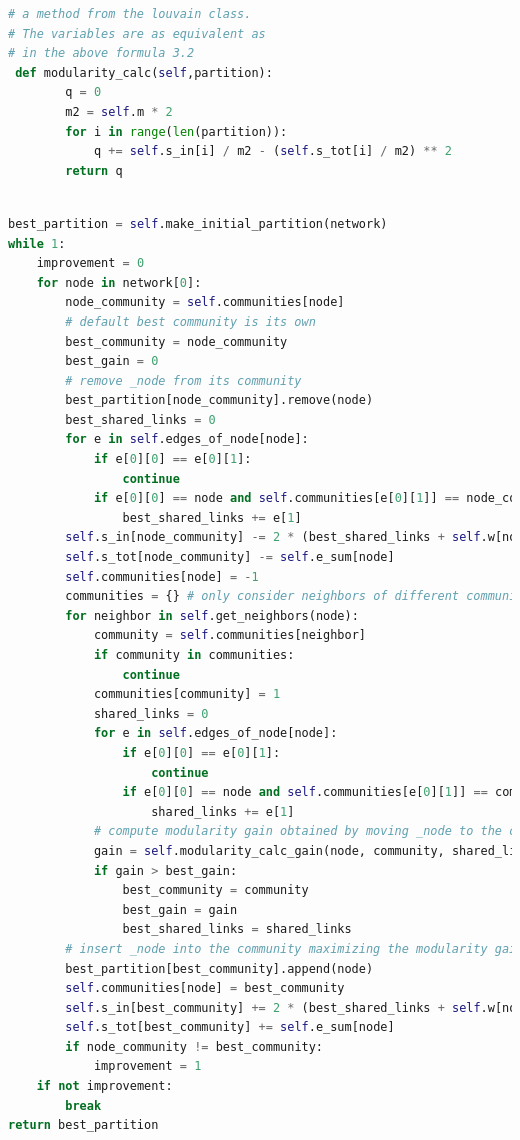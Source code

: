 \begin{lstlisting}[language=Python, caption=Modularity Calculation]
# a method from the louvain class. 
# The variables are as equivalent as 
# in the above formula 3.2
 def modularity_calc(self,partition):
        q = 0
        m2 = self.m * 2 
        for i in range(len(partition)):
            q += self.s_in[i] / m2 - (self.s_tot[i] / m2) ** 2
        return q
    
\end{lstlisting}

\begin{lstlisting}[language=Python, caption=First Phase of Louvain Algorithm]
best_partition = self.make_initial_partition(network)
while 1:
    improvement = 0
    for node in network[0]:
        node_community = self.communities[node]
        # default best community is its own
        best_community = node_community
        best_gain = 0
        # remove _node from its community
        best_partition[node_community].remove(node)
        best_shared_links = 0
        for e in self.edges_of_node[node]:
            if e[0][0] == e[0][1]:
                continue
            if e[0][0] == node and self.communities[e[0][1]] == node_community or e[0][1] == node and self.communities[e[0][0]] == node_community:
                best_shared_links += e[1]
        self.s_in[node_community] -= 2 * (best_shared_links + self.w[node])
        self.s_tot[node_community] -= self.e_sum[node]
        self.communities[node] = -1
        communities = {} # only consider neighbors of different communities
        for neighbor in self.get_neighbors(node):
            community = self.communities[neighbor]
            if community in communities:
                continue
            communities[community] = 1
            shared_links = 0
            for e in self.edges_of_node[node]:
                if e[0][0] == e[0][1]:
                    continue
                if e[0][0] == node and self.communities[e[0][1]] == community or e[0][1] == node and self.communities[e[0][0]] == community:
                    shared_links += e[1]
            # compute modularity gain obtained by moving _node to the community of _neighbor
            gain = self.modularity_calc_gain(node, community, shared_links)
            if gain > best_gain:
                best_community = community
                best_gain = gain
                best_shared_links = shared_links
        # insert _node into the community maximizing the modularity gain
        best_partition[best_community].append(node)
        self.communities[node] = best_community
        self.s_in[best_community] += 2 * (best_shared_links + self.w[node])
        self.s_tot[best_community] += self.e_sum[node]
        if node_community != best_community:
            improvement = 1
    if not improvement:
        break
return best_partition

\end{lstlisting}

